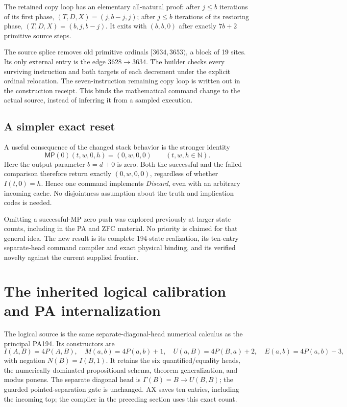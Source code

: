 \documentclass[11pt,letterpaper]{article}
\newcommand{\MP}{\mathsf{MP}}
\begin{document}
The retained copy loop has an elementary all-natural proof: after $j\le b$
iterations of its first phase, $(T,D,X)=(j,b-j,j)$; after $j\le b$
iterations of its restoring phase, $(T,D,X)=(b,j,b-j)$. It exits with
$(b,b,0)$ after exactly $7b+2$ primitive source steps.

The source splice removes old primitive ordinals $[3634,3653)$, a block of
19 sites. Its only external entry is the edge $3628\to3634$. The builder
checks every surviving instruction and both targets of each decrement
under the explicit ordinal relocation. The seven-instruction remaining
copy loop is written out in the construction receipt. This binds the
mathematical command change to the actual source, instead of inferring
it from a sampled execution.

\subsection{A simpler exact reset}

A useful consequence of the changed stack behavior is the stronger identity
\[
 \MP(0)(t,w,0,h)=(0,w,0,0)\qquad(t,w,h\in\mathbb N).
\]
Here the output parameter $b=d+0$ is zero. Both the successful and the
failed comparison therefore return exactly $(0,w,0,0)$, regardless of
whether $I(t,0)=h$. Hence one command implements \emph{Discard}, even with
an arbitrary incoming cache. No disjointness assumption about the
truth and implication codes is needed.

Omitting a successful-MP zero push was explored previously at larger state
counts, including in the PA and ZFC material. No priority is claimed for
that general idea. The new result is its complete 194-state realization,
its ten-entry separate-head command compiler and exact physical binding,
and its verified novelty against the current supplied frontier.



\section{The inherited logical calibration and PA internalization}
\label{sec:logic}

The logical source is the same separate-diagonal-head numerical calculus
as the principal PA194. Its constructors are
\[
 I(A,B)=4P(A,B),\quad M(a,b)=4P(a,b)+1,
 \quad U(a,B)=4P(B,a)+2,\quad E(a,b)=4P(a,b)+3,
\]
with negation $N(B)=I(B,1)$. It retains the six quantified/equality heads,
the numerically dominated propositional schema, theorem generalization,
and modus ponens. The separate diagonal head is
$\Gamma(B)=B\to U(B,B)$; the guarded pointed-separation gate is unchanged.
AX saves ten entries, including the incoming top; the compiler in the
preceding section uses this exact count.
\end{document}
